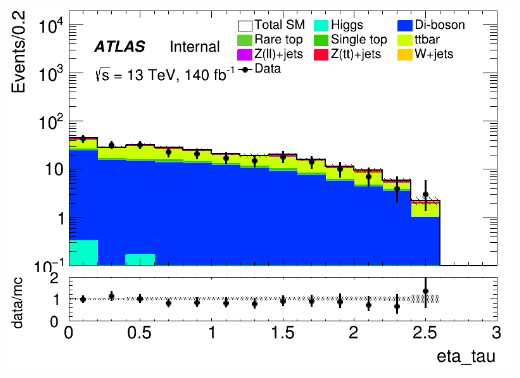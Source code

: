 \documentclass[usenames,dvipsnames]{beamer}
\begin{document}
\begin{frame}
\begin{minipage}{0.32\textwidth}
        \includegraphics[width=\textwidth]{graphics/LLH_met/LLH_met_eta_tau.png}
    \end{minipage}
\end{frame}
\end{document}
